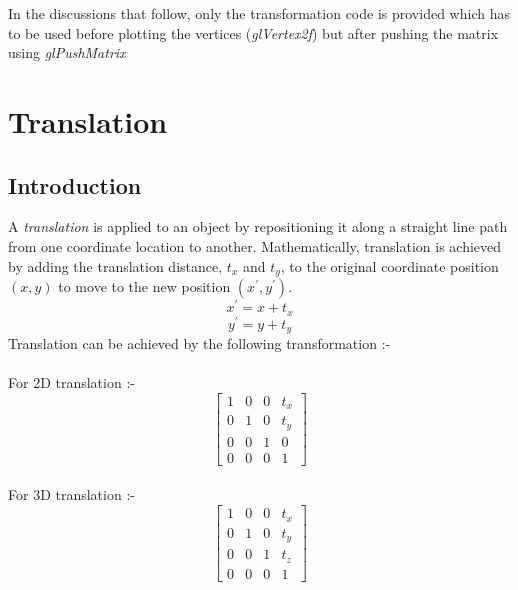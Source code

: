 \documentclass[a4paper,12pt,titlepage,twosided]{article}
\begin{document}
	In the discussions that follow, only the transformation code is provided which has to be used before plotting the vertices (\emph{glVertex2f}) but after pushing the matrix using \emph{glPushMatrix}

\pagebreak
\section{Translation}
	\subsection{Introduction}
	A \emph{translation} is applied to an object by repositioning it along a straight line path from one coordinate location to another. Mathematically, translation is achieved by adding the translation distance, $t_x$ and $t_y$, to the original coordinate position $(x,y)$ to move to the new position $(x^{'},y^{'})$.
	\begin{equation*}
		x^{'} = x + t_x
	\end{equation*}
	\begin{equation*}
		y^{'} = y + t_y
	\end{equation*}
	Translation can be achieved by the following transformation :-\\
	\\
	For 2D translation :-
	\begin {equation*}
		\begin{bmatrix}
			1 & 0 & 0 & t_x \\
			0 & 1 & 0 & t_y \\
			0 & 0 & 1 & 0 \\
			0 & 0 & 0 & 1
		\end{bmatrix}
	\end{equation*}
	\\
	For 3D translation :-
	\begin {equation}
		\begin{bmatrix}
			1 & 0 & 0 & t_x \\
			0 & 1 & 0 & t_y \\
			0 & 0 & 1 & t_z \\
			0 & 0 & 0 & 1
			\label{translation_eq}
		\end{bmatrix}
	\end{equation}
		
\end{document}
